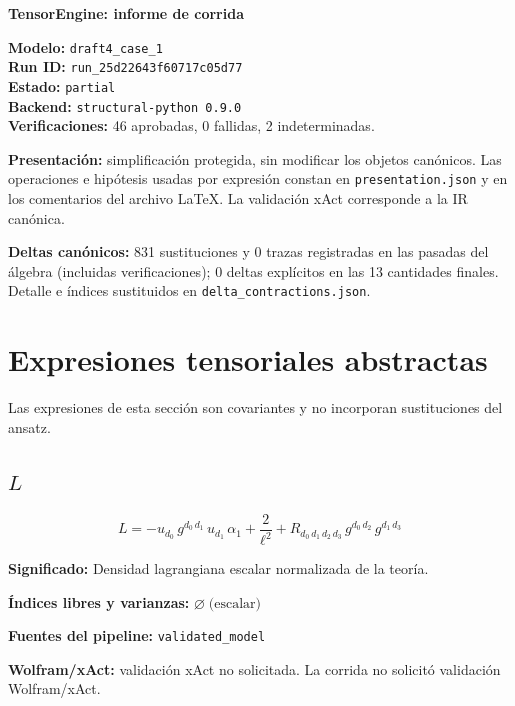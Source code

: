 \documentclass[11pt]{article}
\begin{document}
\begin{center}
{\Large\bfseries TensorEngine: informe de corrida}
\end{center}
\textbf{Modelo:} \texttt{draft4\_case\_1}\\
\textbf{Run ID:} \texttt{run\_25d22643f60717c05d77}\\
\textbf{Estado:} \texttt{partial}\\
\textbf{Backend:} \texttt{structural-python 0.9.0}\\
\textbf{Verificaciones:} 46 aprobadas, 0 fallidas, 2 indeterminadas.
\par\smallskip
\textbf{Presentación:} simplificación protegida, sin modificar los objetos canónicos. Las operaciones e hipótesis usadas por expresión constan en \texttt{presentation.json} y en los comentarios del archivo LaTeX. La validación xAct corresponde a la IR canónica.\par
\textbf{Deltas canónicos:} 831 sustituciones y 0 trazas registradas en las pasadas del álgebra (incluidas verificaciones); 0 deltas explícitos en las 13 cantidades finales. Detalle e índices sustituidos en \texttt{delta\_contractions.json}.\par
\section*{Expresiones tensoriales abstractas}
Las expresiones de esta sección son covariantes y no incorporan sustituciones del ansatz.
\subsection*{$ L $}
\begin{dmath*}[breakdepth={5}]
L = -u{}_{d_{0}}\,g{}^{d_{0}\,d_{1}}\,u{}_{d_{1}}\,\alpha_{1} + \frac{2}{{\ell}^{2}} + R{}_{d_{0}\,d_{1}\,d_{2}\,d_{3}}\,g{}^{d_{0}\,d_{2}}\,g{}^{d_{1}\,d_{3}}
\end{dmath*}
\par\vspace{1.2\baselineskip}\noindent
\begin{minipage}{\linewidth}
\textbf{Significado:} Densidad lagrangiana escalar normalizada de la teoría.\par
\textbf{Índices libres y varianzas:} $ \varnothing\;\text{(escalar)} $\par
\textbf{Fuentes del pipeline:} \texttt{validated\_model}\par
\textbf{Wolfram/xAct:} validación xAct no solicitada. La corrida no solicitó validación Wolfram/xAct.\par
\end{minipage}
\end{document}

